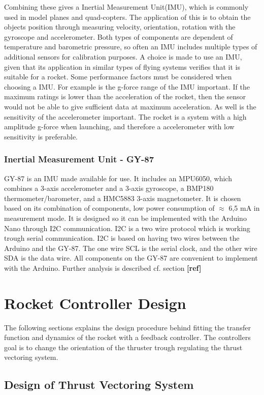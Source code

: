 Combining these gives a Inertial Measurement Unit(IMU), which is commonly used in model planes and quad-copters. The application of this is to obtain the objects position through measuring velocity, orientation, rotation with the gyroscope and accelerometer. Both types of components are dependent of temperature and barometric pressure, so often an IMU includes multiple types of additional sensors for calibration purposes. A choice is made to use an IMU, given that its application in similar types of flying systems verifies that it is suitable for a rocket.    	  
Some performance factors must be considered when choosing a IMU. For example is the g-force range of the IMU important. If the maximum ratings is lower than the acceleration of the rocket, then the sensor would not be able to give sufficient data at maximum acceleration. As well is the sensitivity of the accelerometer important. The rocket is a system with a high amplitude g-force when launching, and therefore a accelerometer with low sensitivity is preferable.

\subsubsection{Inertial Measurement Unit - GY-87}
GY-87\cite{web:GY80} is an IMU made available for use. It includes an MPU6050, which combines a 3-axis accelerometer and a 3-axis gyroscope, a BMP180 thermometer/barometer, and a HMC5883 3-axis magnetometer. It is chosen based on its combination of components, low power consumption of $\approx$ 6,5 mA in measurement mode. It is designed so it can be implemented with the Arduino Nano through I2C communication. 
I2C is a two wire protocol which is working trough serial communication. I2C is based on having two wires between the Arduino and the GY-87. The one wire SCL is the serial clock, and the other wire SDA is the data wire. All components on the GY-87 are convenient to implement with the Arduino. Further analysis is described cf. section \textbf{[ref]} 



\section{Rocket Controller Design}\label{sec:RocketControllerDesign}
The following sections explains the design procedure behind fitting the transfer function and dynamics of the rocket with a feedback controller. The controllers goal is to change the orientation of the thruster trough regulating the thrust vectoring system.    



\subsection{Design of Thrust Vectoring System}

  
